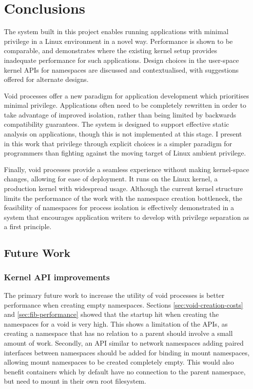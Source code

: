 \documentclass[12pt,a4paper,twoside]{report}
\begin{document}
\chapter{Conclusions}
\label{chap:conclusions}

The system built in this project enables running applications with minimal privilege in a Linux environment in a novel way. Performance is shown to be comparable, and demonstrates where the existing kernel setup provides inadequate performance for such applications. Design choices in the user-space kernel APIs for namespaces are discussed and contextualised, with suggestions offered for alternate designs.

Void processes offer a new paradigm for application development which prioritises minimal privilege. Applications often need to be completely rewritten in order to take advantage of improved isolation, rather than being limited by backwards compatibility guarantees. The system is designed to support effective static analysis on applications, though this is not implemented at this stage. I present in this work that privilege through explicit choices is a simpler paradigm for programmers than fighting against the moving target of Linux ambient privilege.

Finally, void processes provide a seamless experience without making kernel-space changes, allowing for ease of deployment. It runs on the Linux kernel, a production kernel with widespread usage. Although the current kernel structure limits the performance of the work with the namespace creation bottleneck, the feasibility of namespaces for process isolation is effectively demonstrated in a system that encourages application writers to develop with privilege separation as a first principle.

\section{Future Work}
\label{sec:future-work}

\subsection{Kernel API improvements}
\label{sec:future-work-kernel-api}

The primary future work to increase the utility of void processes is better performance when creating empty namespaces. Sections \ref{sec:void-creation-costs} and \ref{sec:fib-performance} showed that the startup hit when creating the namespaces for a void is very high. This shows a limitation of the APIs, as creating a namespace that has no relation to a parent should involve a small amount of work. Secondly, an API similar to network namespaces adding paired interfaces between namespaces should be added for binding in mount namespaces, allowing mount namespaces to be created completely empty. This would also benefit containers which by default have no connection to the parent namespace, but need to mount in their own root filesystem.
\end{document}

